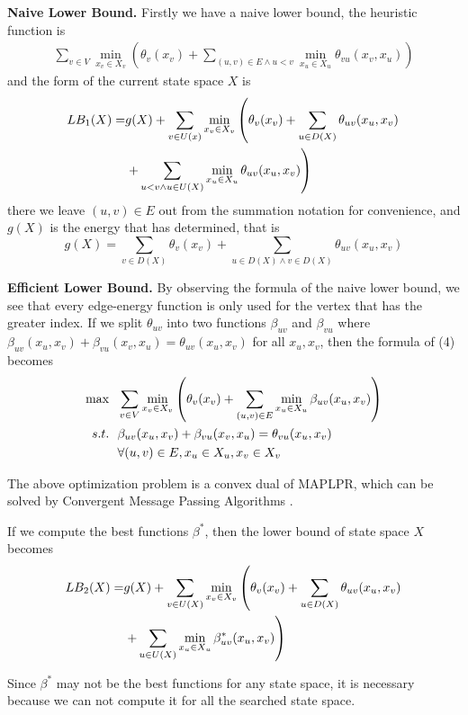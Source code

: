 \noindent\textbf{Naive Lower Bound.}
Firstly we have a naive lower bound, the heuristic function is
\begin{align}
\sum_{v\in V}\min_{x_v\in X_v}\left(\theta_v(x_v)+\sum_{(u,v)\in E\wedge u<v}\min_{x_u\in X_u}\theta_{vu}(x_v,x_u)\right)
\end{align}
and the form of the current state space $X$ is
\begin{align}
LB_1(X)=&g(X)+\sum_{v\in U(x)}\min_{x_v\in X_v}\left(\theta_v(x_v)+\sum_{u\in D(X)}\theta_{uv}(x_u,x_v)\notag\right. \\
&\left.+\sum_{u<v\wedge u\in U(X)}\min_{x_u\in X_u}\theta_{uv}(x_u,x_v)\right)
\end{align}
there we leave $(u,v)\in E$ out from the summation notation for convenience, and $g(X)$ is the energy that has determined, that is
\[
g(X) = \sum_{v\in D(X)}\theta_v(x_v)+\sum_{u\in D(X)\wedge v\in D(X)}\theta_{uv}(x_u,x_v)
\]

\noindent\textbf{Efficient Lower Bound.}
By observing the formula of the naive lower bound, we see that every edge-energy function is only used for the vertex that has the greater index. If we split $\theta_{uv}$ into two functions $\beta_{uv}$ and $\beta_{vu}$ where $\beta_{uv}(x_u,x_v)+\beta_{vu}(x_v,x_u)=\theta_{uv}(x_u,x_v)$ for all $x_u,x_v$, then the formula of (4) becomes
\begin{align}
\max & \ \ \sum_{v\in V}\min_{x_v\in X_v}\left(\theta_v(x_v)+\sum_{(u,v)\in E}\min_{x_u\in X_u}\beta_{uv}(x_u,x_v)\right) \\
s.t. & \ \ \beta_{uv}(x_u,x_v)+\beta_{vu}(x_v,x_u)=\theta_{vu}(x_u,x_v) \notag \\
& \ \ \forall (u,v)\in E,x_u\in X_u,x_v\in X_v \notag
\end{align}

The above optimization problem is a convex dual of MAPLPR, which can be solved by Convergent Message Passing Algorithms \cite[]{globerson2008fixing}.

If we compute the best functions $\beta^*$, then the lower bound of state space $X$ becomes
\begin{align}
LB_2(X)=&g(X)+\sum_{v\in U(X)}\min_{x_v\in X_v}\left(\theta_v(x_v)+\sum_{u\in D(X)}\theta_{uv}(x_u,x_v)\right. \notag \\
&\left.+\sum_{u\in U(X)}\min_{x_u\in X_u}\beta_{uv}^*(x_u,x_v)\right)
\end{align}

Since $\beta^*$ may not be the best functions for any state space, it is necessary because we can not compute it for all the searched state space.

